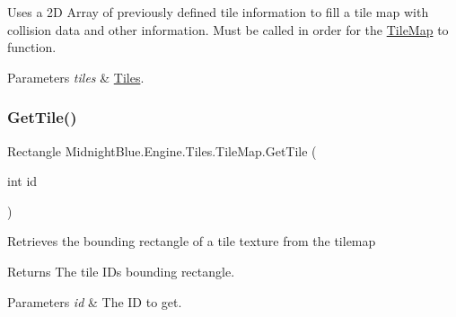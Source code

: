 Uses a 2D Array of previously defined tile information to fill a tile map with collision data and other information. Must be called in order for the \hyperlink{class_midnight_blue_1_1_engine_1_1_tiles_1_1_tile_map}{Tile\+Map} to function. 


\begin{DoxyParams}{Parameters}
{\em tiles} & \hyperlink{namespace_midnight_blue_1_1_engine_1_1_tiles}{Tiles}.\\
\hline
\end{DoxyParams}
\hypertarget{class_midnight_blue_1_1_engine_1_1_tiles_1_1_tile_map_ae4d1521e4d80f255fb926141378966ca}{}\label{class_midnight_blue_1_1_engine_1_1_tiles_1_1_tile_map_ae4d1521e4d80f255fb926141378966ca} 
\subsubsection{\texorpdfstring{Get\+Tile()}{GetTile()}}
{\footnotesize\ttfamily Rectangle Midnight\+Blue.\+Engine.\+Tiles.\+Tile\+Map.\+Get\+Tile (\begin{DoxyParamCaption}\item[{int}]{id }\end{DoxyParamCaption})\hspace{0.3cm}{\ttfamily [inline]}}



Retrieves the bounding rectangle of a tile texture from the tilemap 

\begin{DoxyReturn}{Returns}
The tile ID\textquotesingle{}s bounding rectangle.
\end{DoxyReturn}

\begin{DoxyParams}{Parameters}
{\em id} & The ID to get.\\
\hline
\end{DoxyParams}
\hypertarget{class_midnight_blue_1_1_engine_1_1_tiles_1_1_tile_map_a503a61faaa4edd93bfa18258785726ec}{}\label{class_midnight_blue_1_1_engine_1_1_tiles_1_1_tile_map_a503a61faaa4edd93bfa18258785726ec} 
